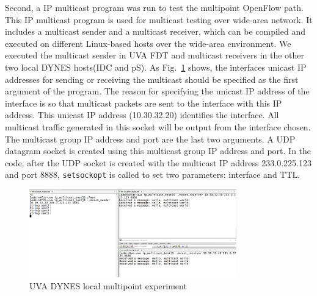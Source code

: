 Second, a IP multicast program was run to test the multipoint OpenFlow path. This IP multicast program is used for multicast testing 
over wide-area network. It includes a multicast sender and a multicast receiver,
which can be compiled and executed on different Linux-based hosts over the wide-area environment. 
We executed the multicast sender in UVA FDT and multicast receivers in the other two local DYNES hosts(IDC and pS). 
As Fig.~\ref{fig:localmulticast} shows, the interfaces unicast IP addresses for sending or receiving the multicast should be specified as the first argument of the program. The reason for specifying the unicast IP address of the interface is so that multicast packets are sent to the interface with this IP address. This unicast IP address (10.30.32.20) identifies the interface. All multicast traffic generated in this socket will be output from the interface chosen. The multicast group IP address and port are the last two arguments. A UDP datagram socket is created using this multicast group IP address and port. In the code, after the UDP socket is created with the multicast IP address 233.0.225.123 and port 8888, \texttt{setsockopt} is called to set two parameters: interface and TTL. 

\begin{figure}[htb!]
\centering
\includegraphics[width=0.8\textwidth]{figures/local-multicast.png}
\caption{UVA DYNES local multipoint experiment}
\label{fig:localmulticast}
\end{figure}

